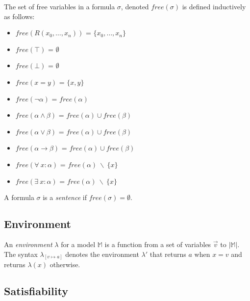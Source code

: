 		The set of free variables in a formula $\sigma$, denoted $free(\sigma)$
		is defined inductively as follows:
		\begin{itemize}
		\item $free( R(x_0,\ldots,x_n) )$ = $\{x_0,\ldots,x_n\}$
		\item $free(\top)$ = $\emptyset$
		\item $free(\bot)$ = $\emptyset$
		\item $free(x = y)$ = $\{x,y\}$
		\item $free(\neg\alpha)$ = $free(\alpha)$
		\item $free(\alpha \wedge \beta)$ = $free(\alpha) \cup free(\beta)$
		\item $free(\alpha \vee   \beta)$ = $free(\alpha) \cup free(\beta)$
		\item $free(\alpha \to    \beta)$ = $free(\alpha) \cup free(\beta)$
		\item $free(\forall\ x : \alpha)$ = $free(\alpha)\ \backslash\ \{x\}$
		\item $free(\exists\ x : \alpha)$ = $free(\alpha)\ \backslash\ \{x\}$
		\end{itemize}
		A formula $\sigma$ is a \emph{sentence} if $free(\sigma) = \emptyset$.

	\subsection{Environment}

		An \emph{environment} $\lambda$ for a model $\mathbb{M}$ is a function
		from a set of variables $\vec v$ to $|\mathbb{M}|$. The syntax
		$\lambda_{[v \mapsto a]}$ denotes the environment $\lambda'$ that
		returns $a$ when $x=v$ and returns $\lambda(x)$ otherwise.

	\subsection{Satisfiability}

